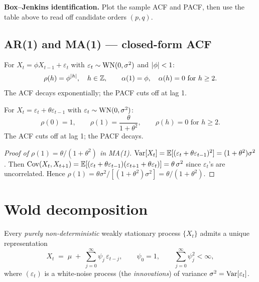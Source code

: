 \medskip
\noindent\textbf{Box--Jenkins identification.} Plot the sample ACF and
PACF, then use the table above to read off candidate orders $(p, q)$.

\subsection{AR(1) and MA(1) — closed-form ACF}

\begin{exbox}[AR(1) ACF]
\label{ex:ar1-acf}
For $X_t = \phi X_{t-1} + \varepsilon_t$ with
$\varepsilon_t \sim \mathrm{WN}(0, \sigma^2)$ and $\left\lvert \phi \right\rvert < 1$:
\[
  \rho(h) = \phi^{\left\lvert h \right\rvert}, \quad h \in \mathbb{Z},
  \qquad
  \alpha(1) = \phi, \quad \alpha(h) = 0 \text{ for } h \geq 2.
\]
The ACF decays exponentially; the PACF cuts off at lag 1.
\end{exbox}

\begin{exbox}[MA(1) ACF]
\label{ex:ma1-acf}
For $X_t = \varepsilon_t + \theta \varepsilon_{t-1}$ with
$\varepsilon_t \sim \mathrm{WN}(0, \sigma^2)$:
\[
  \rho(0) = 1, \qquad
  \rho(1) = \frac{\theta}{1 + \theta^2}, \qquad
  \rho(h) = 0 \text{ for } h \geq 2.
\]
The ACF cuts off at lag 1; the PACF decays.
\end{exbox}

\begin{proof}[Proof of $\rho(1) = \theta / (1 + \theta^2)$ in MA(1)]
$\mathrm{Var}[X_t] = \mathbb{E}[(\varepsilon_t + \theta\varepsilon_{t-1})^2]
= (1 + \theta^2)\sigma^2$. Then
$\mathrm{Cov}(X_t, X_{t+1}) = \mathbb{E}[(\varepsilon_t + \theta\varepsilon_{t-1})
(\varepsilon_{t+1} + \theta\varepsilon_t)] = \theta\,\sigma^2$ since
$\varepsilon_t$'s are uncorrelated. Hence $\rho(1) =
\theta\sigma^2 / [(1 + \theta^2)\sigma^2] = \theta / (1 + \theta^2)$.
\end{proof}

\section{Wold decomposition}
\label{sec:wold}

\begin{thbox}
\label{th:wold}
Every \emph{purely non-deterministic} weakly stationary process
$\{X_t\}$ admits a unique representation
\[
  X_t \;=\; \mu \;+\; \sum_{j = 0}^{\infty} \psi_j\, \varepsilon_{t - j},
  \qquad
  \psi_0 = 1, \qquad \sum_{j = 0}^{\infty} \psi_j^2 < \infty,
\]
where $(\varepsilon_t)$ is a white-noise process (the
\emph{innovations}) of variance
$\sigma^2 = \mathrm{Var}[\varepsilon_t]$.
\end{thbox}


